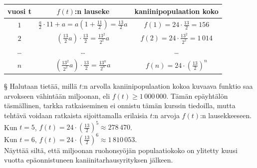 \begin{esimerkki}
\begin{esimratk}
{\begin{tabular}{|c|c|c|}                                                     \hline
\textbf{vuosi t} & \textbf{$f(t)$:n lauseke} & \textbf{kaniinipopulaation koko}\\ \hline
$1$ &   $\frac{a}{2}\cdot11 + a = a(1+\frac{11}{2}) = \frac{13}{2}a$ & $f(1)=24\cdot\frac{13}{2}= 156$ \\ \hline 
$2$ &   $\left(\frac{13}{2}a\right)\cdot\frac{13}{2}= \frac{13^2}{2^2}a$  & $f(2)=24\cdot\frac{13^2}{2^2}= 1\,014$\\ \hline 
\ldots  & 		\ldots	&	\ldots	 \\ \hline
$n$ &   $\left(\frac{13^2}{2^2}a\right)\cdot\frac{13}{2} = \frac{13^n}{2^n}a$   & $f(n)=24\cdot\left(\frac{13}{2}\right)^n$\\ \hline 
    \end{tabular}
 
§ Halutaan tietää, millä $t$:n arvolla kaniinipopulaation kokoa kuvaava funktio saa arvokseen vähintään miljoonan, eli $f(t)\geq1\,000\,000$. Tämän epäyhtälön täsmällinen, tarkka ratkaiseminen ei onnistu tämän kurssin tiedoilla, mutta tehtävä voidaan ratkaista sijoittamalla erilaisia $t$:n arvoja $f(t)$:n lausekkeeseen.\\
Kun $t=5$, $f(t)=24\cdot\left(\frac{13}{2}\right)^5 \approx 278\,470$. \\
Kun $t=6$, $f(t)=24\cdot\left(\frac{13}{2}\right)^6 \approx 1\,810\,053$. \\

Näyttää siltä, että miljoonan ruohonsyöjän populaatiokoko on ylitetty kuusi vuotta epäonnistuneen kaniinitarhausyrityksen jälkeen.
}
	\end{esimratk}
	\begin{esimvast}
	\end{esimvast}
\end{esimerkki}
